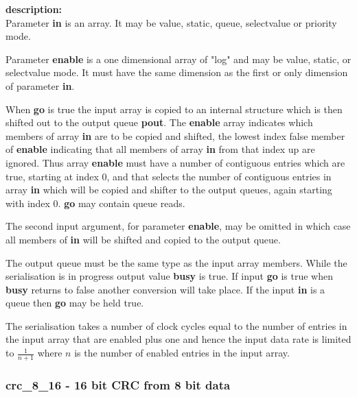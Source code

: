             {\bf description:} \\
            Parameter {\bf in} is an array. It may be value, static, queue,
            selectvalue or priority mode.
            
            Parameter {\bf enable} is a one dimensional array of "log" and may
            be value, static, or selectvalue mode. It must have the same
            dimension as the first or only dimension of parameter {\bf in}.            
            
            When {\bf go} is true the input array is copied to an internal
            structure which is then shifted out to the output queue {\bf pout}.
            The {\bf enable} array indicates which members of array {\bf in} are
            to be copied and shifted, the lowest index false member of {\bf
            enable} indicating that all members of array {\bf in} from that
            index up are ignored. Thus array {\bf enable} must have a number of
            contiguous entries which are true, starting at index 0, and that
            selects the number of contiguous entries in array {\bf in} which
            will be copied and shifter to the output queues, again starting with
            index 0. {\bf go} may contain queue reads.
            
            The second input argument, for parameter {\bf enable}, may be
            omitted in which case all members of {\bf in} will be shifted and
            copied to the output queue.
            
            The output queue must be the same type as the input
            array members. While the serialisation is in progress output value
            {\bf busy} is true. If input {\bf go} is true when {\bf busy} returns to
            false another conversion will take place. If the input {\bf in} is a queue
            then {\bf go} may be held true.
            
            The serialisation takes a number of clock cycles equal to the number
            of entries in the input array that are enabled plus one and hence
            the input data rate is limited to $\frac{1}{n+1}$ where $n$ is the
            number of enabled entries in the input array.



    
        \subsubsection{crc\_8\_16 - 16 bit CRC from 8 bit data}\label{sec:lmcrc816}


